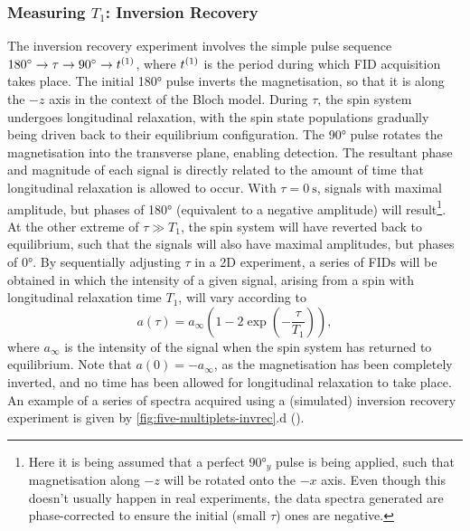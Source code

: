 \subsubsection{Measuring $T_1$: Inversion Recovery}
\label{subsec:invrec}
The inversion recovery experiment involves the simple pulse sequence $\ang{180}
\rightarrow \tau \rightarrow \ang{90} \rightarrow t^{(1)}$, where $t^{(1)}$ is the
period during which \ac{FID} acquisition takes place. The initial
\ang{180} pulse inverts the magnetisation, so that it is along the $-z$ axis in
the context of the Bloch model. During $\tau$, the spin system undergoes
longitudinal
relaxation, with the spin state populations gradually being driven back to
their equilibrium configuration. The \ang{90} pulse rotates the magnetisation
into the transverse plane, enabling detection. The resultant phase and
magnitude of each signal is directly related to the amount of time that
longitudinal relaxation is allowed to occur. With $\tau = \qty{0}{\second}$,
signals with maximal amplitude, but phases of \ang{180} (equivalent to a
negative amplitude) will result\footnote{
    Here it is being assumed that a perfect $\ang{90}_y$ pulse is being
    applied, such that magnetisation along $-z$ will be rotated onto the $-x$
    axis. Even though this doesn't usually happen in real experiments, the data
    spectra generated are phase-corrected to ensure the initial (small $\tau$)
    ones are negative.
}. At the other extreme of $\tau \gg T_1$,
the spin system will have reverted
back to equilibrium, such that the signals will also have maximal amplitudes,
but phases of \ang{0}. By sequentially adjusting $\tau$ in a
\ac{2D} experiment, a series of \acp{FID} will be obtained in which the intensity
of a given signal, arising from a spin with longitudinal relaxation time $T_1$,
will vary according to
\begin{equation}
    a\left(\tau\right) = a_{\infty} \left( 1 - 2 \exp\left( -\frac{\tau}{T_1}\right) \right),
\end{equation}
where $a_{\infty}$ is the intensity of the signal when the spin system
has returned to equilibrium. Note that $a(0) = -a_{\infty}$, as the magnetisation
has been completely inverted, and no time has been allowed for longitudinal
relaxation to take place. An example of a series of spectra acquired using a
(simulated) inversion recovery experiment is given by
\cref{fig:five-multiplets-invrec}.d ().

